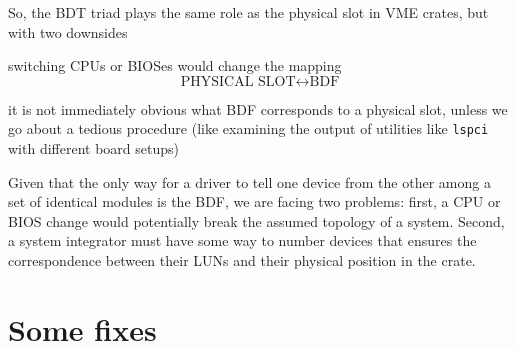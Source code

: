 \documentclass[a4paper]{article}
\newcommand\fname[1]{\texttt{#1}}
\begin{document}
So, the BDT triad plays the same role as the physical slot in VME
crates, but with two downsides
\begin{compactitem}
\item switching CPUs or BIOSes would change the mapping 
\begin{equation*}
\text{PHYSICAL SLOT} \leftrightarrow \text{BDF}
\end{equation*}
\item it is not immediately obvious what BDF corresponds to a physical
slot, unless we go about a tedious procedure (like examining the 
output of utilities like \fname{lspci} with different board setups)
\end{compactitem}
Given that the only way for a driver to tell one device from the other
among a set of identical modules is the BDF, we are facing two problems:
first, a CPU or BIOS change would potentially break the assumed topology
of a system. Second, a system integrator must have some way to number
devices that ensures the correspondence between their LUNs and their
physical position in the crate.

\section{Some fixes}

\label{crateconfigs}
\end{document}
